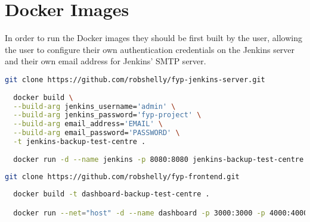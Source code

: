 \section{Docker Images}
In order to run the Docker images they should be first built by the user, allowing the user to configure their own authentication credentials on the Jenkins server and their own email address for Jenkins' SMTP server.

\noindent\begin{minipage}{\textwidth}
  \begin{lstlisting}[caption={Build Jenkins Management Server},label=jenkins,language=bash]
  git clone https://github.com/robshelly/fyp-jenkins-server.git
  
  docker build \
  --build-arg jenkins_username='admin' \
  --build-arg jenkins_password='fyp-project' \
  --build-arg email_address='EMAIL' \
  --build-arg email_password='PASSWORD' \
  -t jenkins-backup-test-centre .
  
  docker run -d --name jenkins -p 8080:8080 jenkins-backup-test-centre
  \end{lstlisting}
\end{minipage}

\noindent\begin{minipage}{\textwidth}
  \begin{lstlisting}[caption={Build Fronted UI Server},label=jenkins,language=bash]
  git clone https://github.com/robshelly/fyp-frontend.git
  
  docker build -t dashboard-backup-test-centre .

  docker run --net="host" -d --name dashboard -p 3000:3000 -p 4000:4000 dashboard-backup-test-centre
  \end{lstlisting}
\end{minipage}

